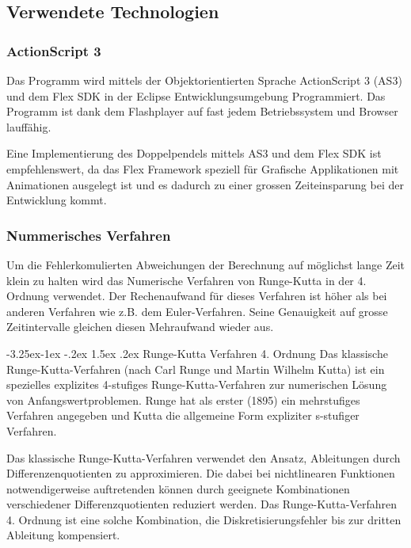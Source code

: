 \documentclass[12pt]{article}
\makeatletter
\numberwithin{equation}{subsection}
\renewcommand\paragraph{\@startsection{paragraph}{4}{\z@}%
  {-3.25ex\@plus -1ex \@minus -.2ex}%
  {1.5ex \@plus .2ex}%
  {\normalfont\normalsize\bfseries}}
\makeatother
\begin{document}
\subsection{Verwendete Technologien}
\subsubsection{ActionScript 3}
Das Programm wird mittels der Objektorientierten Sprache ActionScript 3 (AS3) und dem Flex SDK in der Eclipse Entwicklungsumgebung Programmiert. Das Programm ist dank dem Flashplayer auf fast jedem Betriebssystem und Browser lauffähig.

Eine Implementierung des Doppelpendels mittels AS3 und dem Flex SDK ist  empfehlenswert, da das Flex Framework speziell für Grafische Applikationen mit Animationen ausgelegt ist und es dadurch zu einer grossen Zeiteinsparung bei der Entwicklung kommt.

\subsubsection{Nummerisches Verfahren}
Um die Fehlerkomulierten Abweichungen der Berechnung auf möglichst lange Zeit klein zu halten wird das Numerische Verfahren von Runge-Kutta in der 4. Ordnung verwendet. Der Rechenaufwand für dieses Verfahren ist höher als bei anderen Verfahren wie z.B. dem Euler-Verfahren. Seine Genauigkeit auf grosse Zeitintervalle gleichen diesen Mehraufwand wieder aus.

\paragraph{Runge-Kutta Verfahren 4. Ordnung}
Das klassische Runge-Kutta-Verfahren (nach Carl Runge und Martin Wilhelm Kutta) ist ein spezielles explizites 4-stufiges Runge-Kutta-Verfahren zur numerischen Lösung von Anfangswertproblemen. Runge hat als erster (1895) ein mehrstufiges Verfahren angegeben und Kutta die allgemeine Form expliziter s-stufiger Verfahren.

Das klassische Runge-Kutta-Verfahren verwendet den Ansatz, Ableitungen durch Differenzenquotienten zu approximieren. Die dabei bei nichtlinearen Funktionen notwendigerweise auftretenden können durch geeignete Kombinationen verschiedener Differenzquotienten reduziert werden. Das Runge-Kutta-Verfahren 4. Ordnung ist eine solche Kombination, die Diskretisierungsfehler bis zur dritten Ableitung kompensiert.
\end{document}
